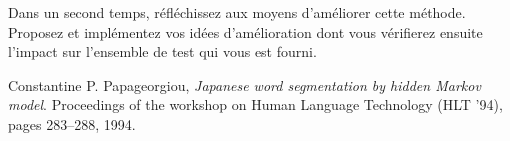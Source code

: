 \documentclass[12pt,a4paper]{article}
\begin{document}
Dans un second temps, réfléchissez aux moyens d'améliorer cette méthode.
Proposez et implémentez vos idées d'amélioration dont vous vérifierez ensuite l'impact sur l'ensemble de test qui vous est fourni.

\begin{thebibliography}{9}

  Constantine P. Papageorgiou,
  \emph{Japanese word segmentation by hidden Markov model}.
  Proceedings of the workshop on Human Language Technology (HLT '94),
  pages 283--288,
  1994.

\end{thebibliography}
\end{document}
